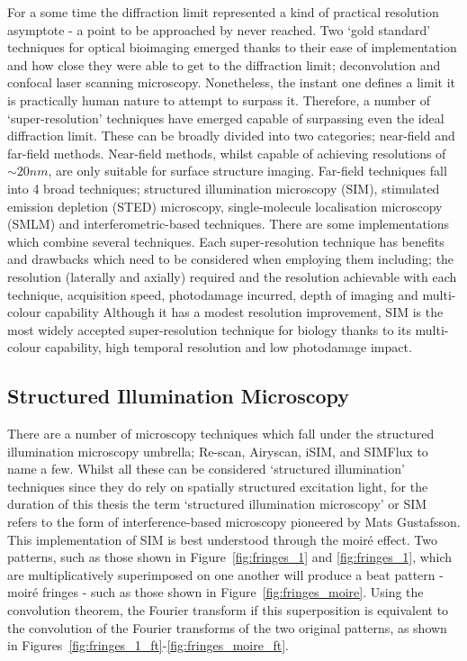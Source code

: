 For a some time the diffraction limit represented a kind of practical 
resolution asymptote - a point to be approached by never reached. Two
`gold standard' techniques for optical bioimaging emerged thanks to their
ease of implementation and how close they were able to get to the diffraction
limit; deconvolution\cite{agard1983three, wallace2001workingperson} and
confocal laser scanning microscopy\cite{sheppard1981theory,minsky1988memoir}. 
Nonetheless, the instant one defines a limit it is practically human nature 
to attempt to surpass it. Therefore, a number of `super-resolution' techniques
have emerged capable of surpassing even the ideal diffraction limit. These
can be broadly divided into two categories; near-field and far-field methods.
Near-field methods, whilst capable of achieving resolutions of $\sim 20 nm$,
are only suitable for surface structure imaging\cite{schermelleh2010guide}. 
Far-field techniques fall into 4 broad techniques; structured illumination
microscopy (SIM), stimulated emission depletion (STED) microscopy, 
single-molecule localisation microscopy (SMLM) and interferometric-based 
techniques. There are some implementations which combine several 
techniques. Each super-resolution technique has benefits and drawbacks which 
need to be considered when employing them including; the resolution 
(laterally and axially) required and the resolution achievable with each 
technique, acquisition speed, photodamage incurred, depth of imaging and 
multi-colour capability\cite{hell20152015,schermelleh2019super} Although it 
has a modest resolution improvement, SIM is the most widely accepted 
super-resolution technique for biology thanks to its multi-colour capability,
high temporal resolution and low photodamage impact\cite{leung2011review}.

\subsection{Structured Illumination Microscopy}
\label{subsec:SIM}

There are a number of microscopy techniques which fall under the structured
illumination microscopy umbrella; Re-scan\cite{de2013re}, 
Airyscan\cite{huff2015airyscan}, iSIM\cite{york2013instant,curd2015construction},
and SIMFlux\cite{cnossen2020localization} to name a few. Whilst all these can be 
considered `structured illumination' techniques since they do rely on spatially 
structured excitation light, for the duration of this thesis the term 
`structured illumination microscopy' or SIM refers to the form of 
interference-based microscopy pioneered by Mats 
Gustafsson\cite{gustafsson1999extended,gustafsson2000surpassing,gustafsson2008three}.
This implementation of SIM is best understood through the moir\'{e} effect.
Two patterns, such as those shown in Figure~\ref{fig:fringes_1} and 
\ref{fig:fringes_1}, which are multiplicatively superimposed on one another
will produce a beat pattern - moir\'{e} fringes - such as those shown in
Figure~\ref{fig:fringes_moire}. Using the convolution theorem, the Fourier
transform if this superposition is equivalent to the convolution of the 
Fourier transforms of the two original patterns\cite{mcgillem1991continuous},
as shown in Figures~\ref{fig:fringes_1_ft}-\ref{fig:fringes_moire_ft}. 

